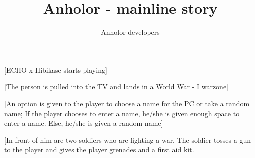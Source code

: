\documentclass[a4paper,12pt]{report}
\title {Anholor - mainline story}
\author {Anholor developers}
\begin{document}
\newline

[ECHO x Hibikase starts playing]\newline

[The person is pulled into the TV and lands in a World War - I warzone]\newline

[An option is given to the player to choose a name for the PC or take a random name; If the player chooses to enter a name, he/she is given enough space to enter a name. Else, he/she is given a random name]\newline

[In front of him are two soldiers who are fighting a war. The soldier tosses a gun to the player and gives the player grenades and a first aid kit.]\newline
\end{document}
